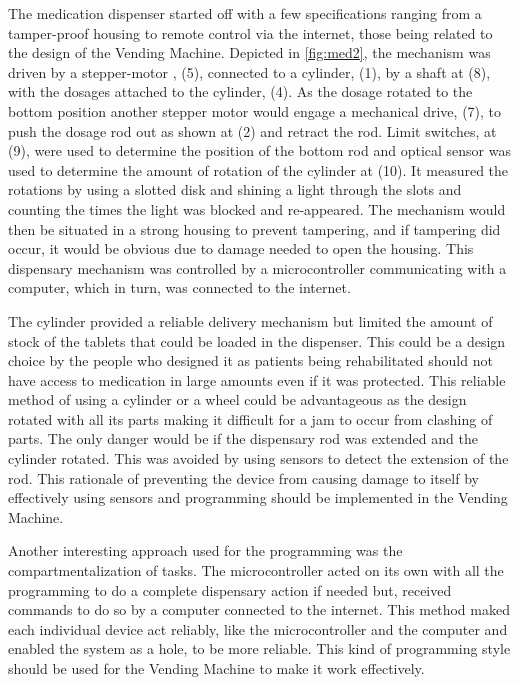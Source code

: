 \documentclass[a4paper,11pt]{article}
\newcommand*{\halfref}[1]{\hyperref[{#1}]{\autoref*{#1}}}
\numberwithin{figure}{section}
\numberwithin{table}{section}
\begin{document}
The medication dispenser started off with a few specifications ranging from a tamper-proof housing to remote control via the internet, those being related to the design of the Vending Machine. Depicted in  \halfref{fig:med2}, the mechanism was driven by a stepper-motor , (5), connected to a cylinder, (1), by a shaft at (8), with the dosages attached to the cylinder, (4). As the dosage rotated to the bottom position another stepper motor would engage a mechanical drive, (7), to push the dosage rod out as shown at (2) and retract the rod. Limit switches, at (9), were used to determine the position of the bottom rod and optical sensor was used to determine the amount of rotation of the cylinder at (10). It measured the rotations by using a slotted disk and shining a light through the slots and counting the times the light was blocked and re-appeared. The mechanism would then be situated in a strong housing to prevent tampering, and if tampering did occur, it would be obvious due to damage needed to open the housing. This dispensary mechanism was controlled by a microcontroller communicating with a computer, which in turn, was connected to the internet. 

The cylinder provided a reliable delivery mechanism but limited the amount of stock of the tablets that could be loaded in the dispenser. This could be a design choice by the people who designed it as patients being rehabilitated should not have access to medication in large amounts even if it was protected. This reliable method of using a cylinder or a wheel could be advantageous as the design rotated with all its parts making it difficult for a jam to occur from clashing of parts. The only danger would be if the dispensary rod was extended and the cylinder rotated. This was avoided by using sensors to detect the extension of the rod. This rationale of preventing the device from causing damage to itself by effectively using sensors and programming should be implemented in the Vending Machine.

Another interesting approach used for the programming was the compartmentalization of tasks. The microcontroller acted on its own with all the programming to do a complete dispensary action if needed but, received commands to do so by a computer connected to the internet. This method maked each individual device act reliably, like the microcontroller and the computer and enabled the system as a hole, to be more reliable. This kind of programming style should be used for the Vending Machine to make it work effectively.
\end{document}
